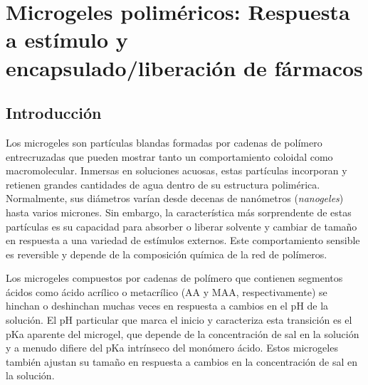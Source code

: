 
\chapter{Microgeles polim\'ericos: Respuesta a est\'imulo y encapsulado/liberaci\'on de f\'armacos} %

\label{Chapter-geles} %


\newcommand{\keyword}[1]{\textbf{#1}}
\newcommand{\tabhead}[1]{\textbf{#1}}
\newcommand{\code}[1]{\texttt{#1}}
\newcommand{\file}[1]{\texttt{\bfseries#1}}
\newcommand{\option}[1]{\texttt{\itshape#1}}





\section{Introducci\'on}


Los microgeles son part\'iculas blandas formadas por cadenas de pol\'imero entrecruzadas que pueden mostrar tanto un comportamiento coloidal como macromolecular\cite{plamper2017functional,lyon2012polymer}.
Inmersas en soluciones acuosas, estas part\'iculas incorporan y retienen grandes cantidades de agua dentro de su estructura polim\'erica.
Normalmente, sus di\'ametros var\'ian desde decenas de nan\'ometros (\emph{nanogeles}) hasta varios micrones.
Sin embargo, la caracter\'istica m\'as sorprendente de estas part\'iculas es su capacidad para absorber o liberar solvente y cambiar de tama\~no en respuesta a una variedad de est\'imulos externos.
Este comportamiento sensible es reversible y depende de la composici\'on qu\'imica de la red de pol\'imeros.

Los microgeles compuestos por cadenas de pol\'imero que contienen segmentos \'acidos como \'acido acr\'ilico o metacr\'ilico (AA y MAA, respectivamente) se hinchan o deshinchan muchas veces en respuesta a cambios en el pH de la soluci\'on\cite{snowden1996colloidal,Zhou1998}.
El pH particular que marca el inicio y caracteriza esta transición es el pKa aparente del microgel, que depende de la concentraci\'on de sal en la soluci\'on y a menudo difiere del pKa intr\'inseco del mon\'omero \'acido.
Estos microgeles tambi\'en ajustan su tama\~no en respuesta a cambios en la concentraci\'on de sal en la soluci\'on\cite{snowden1996colloidal}.

